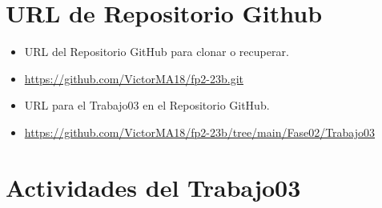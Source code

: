 \documentclass{article}
\begin{document}
	\section{URL de Repositorio Github}
	\begin{itemize}
		\item URL del Repositorio GitHub para clonar o recuperar.
		\item \url{https://github.com/VictorMA18/fp2-23b.git}
		\item URL para el Trabajo03 en el Repositorio GitHub.
		\item \url{https://github.com/VictorMA18/fp2-23b/tree/main/Fase02/Trabajo03}
	\end{itemize}
	
	\section{Actividades del Trabajo03}
\end{document}
